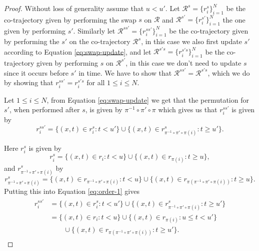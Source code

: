 \documentclass[12pt]{article}
\newcommand{\traj}{r}
\newcommand{\cotraj}{\mathcal{R}}
\newcommand{\swap}{s}
\newcommand{\swaptime}{u}
\theoremstyle{definition}
\begin{document}
\begin{proof}
  Without loss of generality assume that \(\swaptime < \swaptime'\).
  Let \(\cotraj^{\swap} = \{\traj^{\swap}_{i}\}_{i = 1}^{N}\) be the
  co-trajectory given by performing the swap \(\swap\) on \(\cotraj\)
  and \(\cotraj^{\swap'} = \{\traj^{\swap'}_{i}\}_{i = 1}^{N}\) the
  one given by performing \(\swap'\). Similarly let
  \(\cotraj^{\swap\swap'} = \{\traj^{\swap\swap'}_{i}\}_{i = 1}^{N}\)
  be the co-trajectory given by performing the \(\swap'\) on the
  co-trajectory \(\cotraj^{\swap}\), in this case we also first update
  \(\swap'\) according to Equation \ref{eq:swap-update}, and let
  \(\cotraj^{\swap'\swap} = \{\traj^{\swap'\swap}_{i}\}_{i = 1}^{N}\)
  be the co-trajectory given by performing \(\swap\) on
  \(\cotraj^{\swap'}\), in this case we don't need to update \(\swap\)
  since it occurs before \(\swap'\) in time. We have to show that
  \(\cotraj^{\swap\swap'} = \cotraj^{\swap'\swap}\), which we do by
  showing that \(\traj_{i}^{\swap\swap'} = \traj_{i}^{\swap'\swap}\)
  for all \(1 \leq i \leq N\).

  Let \(1 \leq i \leq N\), from Equation \ref{eq:swap-update} we get
  that the permutation for \(\swap'\), when performed after \(\swap\),
  is given by \(\pi^{-1} \circ \pi' \circ \pi\) which gives us that
  \(\traj^{\swap\swap'}_{i}\) is given by
  \begin{equation}
    \label{eq:order-1}
    \traj^{\swap\swap'}_{i} = \{(x, t) \in \traj^{\swap}_{i}: t < u'\}
    \cup \{(x, t) \in \traj^{\swap}_{\pi^{-1} \circ \pi' \circ \pi(i)}: t \geq u'\}.
  \end{equation}

  Here \(\traj^{\swap}_{i}\) is given by
  \begin{equation*}
    \traj^{\swap}_{i} = \{(x, t) \in \traj_{i}: t < u\}
    \cup \{(x, t) \in \traj_{\pi(i)}: t \geq u\},
  \end{equation*}
  and \(\traj^{\swap}_{\pi^{-1} \circ \pi' \circ \pi(i)}\) by
  \begin{equation*}
    \traj^{\swap}_{\pi^{-1} \circ \pi' \circ \pi(i)} = \{(x, t) \in \traj_{\pi^{-1} \circ \pi' \circ \pi(i)}: t < u\}
    \cup \{(x, t) \in \traj_{\pi(\pi^{-1} \circ \pi' \circ \pi(i))}: t \geq u\}.
  \end{equation*}
  Putting this into Equation \ref{eq:order-1} gives
  \begin{align}
    \begin{split}
      \label{eq:order-1-final}
      \traj^{\swap\swap'}_{i} &= \{(x, t) \in \traj^{\swap}_{i}: t < u'\}
      \cup \{(x, t) \in \traj^{\swap}_{\pi^{-1} \circ \pi' \circ \pi(i)}: t \geq u'\}\\
      &= \{(x, t) \in \traj_{i}: t < u\}
      \cup \{(x, t) \in \traj_{\pi(i)}: u \leq t < u'\}\\
      &\qquad \cup \{(x, t) \in \traj_{\pi(\pi^{-1} \circ \pi' \circ \pi(i))}: t \geq u'\}.
    \end{split}
  \end{align}


\end{proof}
\end{document}
